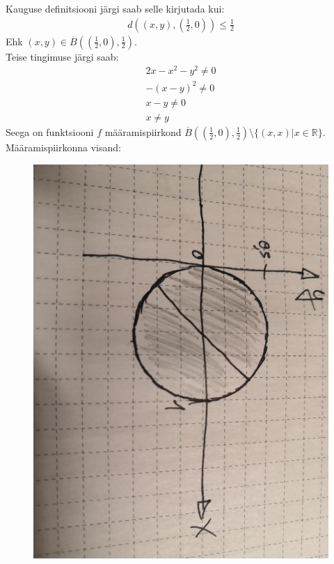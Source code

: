 \documentclass{article}
\begin{document}
Kauguse definitsiooni järgi saab selle kirjutada kui:
\begin{gather*}
d\left((x,y),\left(\frac{1}{2},0\right)\right)\leq\frac{1}{2}
\end{gather*}
Ehk $(x,y)\in\overline{B}\left(\left(\frac{1}{2},0\right),\frac{1}{2}\right)$.\\
Teise tingimuse järgi saab:
\begin{gather*}
2x-x^2-y^2\neq0\\
-(x-y)^2\neq0\\
x-y\neq0\\
x\neq y
\end{gather*}
Seega on funktsiooni $f$ määramispiirkond $\overline{B}\left(\left(\frac{1}{2},0\right),\frac{1}{2}\right)\setminus\{(x,x)|x\in\mathbb{R}\}$.\\
Määramispiirkonna visand:\\
\begin{figure}[htbp]
\centerline{\includegraphics[scale=0.2,angle=90]{maaramispiirkond.jpg}}
\end{figure}\\
\end{document}
